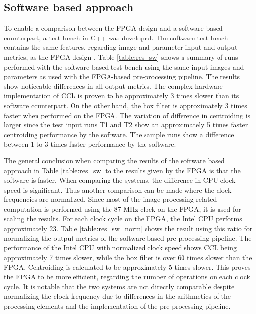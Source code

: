 \documentclass[12pt]{report}
\begin{document}
\subsection{Software based approach}
To enable a comparison between the FPGA-design and a software based counterpart, a test bench in C++ was developed. The software test bench contains the same features, regarding image and parameter input and output metrics, as the FPGA-design \citep{cppImgProc}. Table \ref{table:res_sw} shows a summary of runs performed with the software based test bench using the same input images and parameters as used with the FPGA-based pre-processing pipeline. The results show noticeable differences in all output metrics. The complex hardware implementation of CCL is proven to be approximately 3 times slower than its software counterpart. On the other hand, the box filter is approximately 3 times faster when performed on the FPGA. The variation of difference in centroiding is larger since the test input runs T1 and T2 show an approximately 5 times faster centroiding performance by the software. The sample runs show a difference between 1 to 3 times faster performance by the software.
\par
The general conclusion when comparing the results of the software based approach in Table \ref{table:res_sw} to the results given by the FPGA is that the software is faster. When comparing the systems, the difference in CPU clock speed is significant. Thus another comparison can be made where the clock frequencies are normalized. Since most of the image processing related computation is performed using the 87 MHz clock on the FPGA, it is used for scaling the results. For each clock cycle on the FPGA, the Intel CPU performs approximately 23. Table \ref{table:res_sw_norm} shows the result using this ratio for normalizing the output metrics of the software based pre-processing pipeline. The performance of the Intel CPU with normalized clock speed shows CCL being approximately 7 times slower, while the box filter is over 60 times slower than the FPGA. Centroiding is calculated to be approximately 5 times slower. This proves the FPGA to be more efficient, regarding the number of operations on each clock cycle. It is notable that the two systems are not directly comparable despite normalizing the clock frequency due to differences in the arithmetics of the processing elements and the implementation of the pre-processing pipeline.
\end{document}
